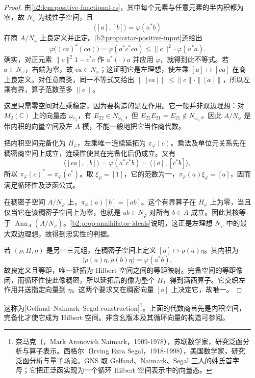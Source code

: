 \begin{proof}
	由\cref{b2:lem:positive-functional-cs}，其中每个元素与任意元素的半内积都为零，故 \(N_\varphi\) 为线性子空间，且
	\[
		\bigl\langle[a],[b]\bigr\rangle=\varphi(a^*b)
	\]
	在商 \(A/N_\varphi\) 上良定义并正定。\cref{b2:prop:cstar-positive-input}还给出
	\begin{equation}\label{b2:eq:gns-bounded-left-action}
		\varphi\bigl((ca)^*(ca)\bigr) =\varphi(a^*c^*ca)\le\|c\|^2\cdot\varphi(a^*a).
	\end{equation}
	确实，对正元素 \(\|c\|^2 1-c^*c\) 作 \(a^*(\cdot)a\) 并应用 \(\varphi\)，就得到此不等式。若 \(a\in N_\varphi\)，右端为零，故 \(ca\in N_\varphi\)；这证明它是左理想，使左乘 \([a]\mapsto[ca]\) 在商上良定义。对任意商类，同一不等式又给出 \(\|[ca]\|\le\|c\|\cdot\|[a]\|\)，所以左乘有界，算子范数至多 \(\|c\|\)。

	这里只需零空间对左乘稳定，因为要构造的是左作用。它一般并非双边理想：对 \(M_2(\mathbb C)\) 上的向量态 \(\omega_{e_1}\)，有 \(E_{22}\in N_{\omega_{e_1}}\)，但 \(E_{22}E_{21}=E_{21}\notin N_{\omega_{e_1}}\)。因此 \(A/N_\varphi\) 是带内积的向量空间及左 \(A\) 模，不能一般地把它当作商代数。

	把内积空间完备化为 \(H_\varphi\)，左乘唯一连续延拓为 \(\pi_\varphi(c)\)。乘法及单位元关系先在稠密商空间上成立，连续性使其在完备化后仍成立。又有
	\[
		\bigl\langle[ca],[b]\bigr\rangle=\varphi(a^*c^*b) =\bigl\langle[a],[c^*b]\bigr\rangle,
	\]
	所以 \(\pi_\varphi(c)^*=\pi_\varphi(c^*)\)。取 \(\xi_\varphi=[1]\)，它的范数为一，\(\pi_\varphi(a)\xi_\varphi=[a]\)，因而满足循环性及泛函公式。

	在稠密子空间 \(A/N_\varphi\) 上，\(\pi_\varphi(a)[b]=[ab]\)。这个有界算子在 \(H_\varphi\) 上为零，当且仅当它在该稠密子空间上为零，也就是 \(ab\in N_\varphi\) 对所有 \(b\in A\) 成立。因此其核等于 \(\operatorname{Ann}_A(A/N_\varphi)\)。\cref{b2:prop:annihilator-ideals}说明，这正是左理想 \(N_\varphi\) 中的最大双边理想，故得到忠实性的判据。

	若 \((\rho,H,\eta)\) 是另一三元组，在稠密子空间上定义 \([a]\mapsto\rho(a)\eta\)。其内积为
	\[
		\bigl\langle\rho(a)\eta,\rho(b)\eta\bigr\rangle=\varphi(a^*b),
	\]
	故良定义且等距，唯一延拓为 Hilbert 空间之间的等距映射。完备空间的等距像闭，而循环性使此像稠密，所以延拓后的像为整个 \(H\)，得到满酉算子。它交织左作用并送指定向量到 \(\eta\)。这两个要求又在稠密向量 \([a]\) 上决定它，故唯一。
\end{proof}

这称为[Gelfand--Naimark--Segal construction]\footnote{奈马克（，Mark Aronovich Naimark，1909-1978），苏联数学家，研究泛函分析与算子表示。西格尔（Irving Ezra Segal，1918-1998），美国数学家，研究泛函分析与量子场论。GNS 取 Gelfand、Naimark、Segal 三人的姓氏首字母；它把正泛函实现为一个循环 Hilbert 空间表示中的向量态。}。上面的代数商首先是内积空间，完备化才使它成为 Hilbert 空间。非含幺版本及其循环向量的构造可参阅\cite[\nopp II.6.4.1--II.6.4.3]{Blackadar2017OperatorAlgebrasCorrected}。

